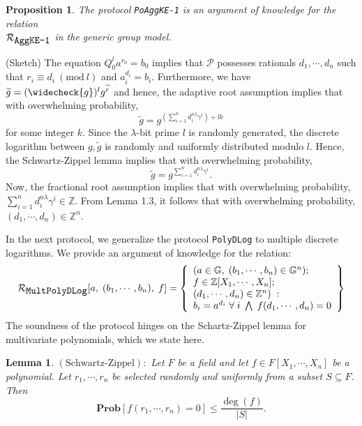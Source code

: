 \documentclass[11pt, lettersize, notitlepage, leqno, footskip=0.6cm]{article}
\newcommand{\bz}{\mathbb Z}
\newcommand{\slim}{\sum\limits}
\newcommand{\wti}{\widetilde}
\newcommand{\mc}{\mathcal}
\newcommand{\mb}{\mathbb}
\newcommand{\mbf}{\mathbf}
\newcommand{\mr}{\mathrm}
\newcommand{\lam}{\lambda}
\newcommand{\weck}{\widecheck}
\newcommand{\sub}{\subseteq}
\newcommand{\mP}{\mc{P}}
\newcommand{\vs}{\vspace{-0.15cm}}
\newcommand{\op}{overwhelming probability}
\newcommand{\Mod}[1]{\ (\mathrm{mod}\ #1)}
\newtheorem{Prop}[Thm]{Proposition}
\newtheorem{Lem}[Thm]{Lemma}
\numberwithin{equation}{section}
\begin{document}
\vspace{0.2cm}

\begin{Prop} The protocol \verb|PoAggKE-1| is an argument of knowledge for the relation\\ $\mc{R}_{{\protect\verb|AggKE-1|}}$ in the generic group model.\end{Prop}

\begin{prf} (Sketch) The equation $Q_0^la^{r_0} = b_0$ implies that $\mP$ possesses rationals $d_1,\cdots,d_n$ such that $r_i\equiv d_i\Mod{l}$ and 
$a_i^{d_i} = b_i$. Furthermore, we have $\wti{g} = (\weck{g})^lg^{\wti{r}}$ and hence, the adaptive root assumption implies that with \op, \vs $$\wti{g} = g^{(\slim_{i=1}^n d_i^{n\lam}\gamma^i)+lk} $$ for some integer $k$. Since the $\lam$-bit prime $l$ is randomly generated, the discrete logarithm between $g,\wti{g}$ is randomly and uniformly distributed modulo $l$. Hence, the Schwartz-Zippel lemma implies that with \op, \vs $$\wti{g} = g^{\slim_{i=1}^n d_i^{n\lam}\gamma^i}.$$ Now, the fractional root assumption implies that with \op, $\slim_{i=1}^n d_i^{n\lam}\gamma^i\in\bz$. From Lemma 1.3, it follows that with \op, $(d_1,\cdots,d_n)\in\bz^n$.\end{prf}

\bigskip

In the next protocol, we generalize the protocol \verb|PolyDLog| to multiple discrete logarithms. We provide an argument of knowledge for the relation: 
\[
  \mc{R}_{{\protect\verb|MultPolyDLog|}}[a,\; (b_1,\cdots, b_n),\; f] = \left\{\begin{array}{l}
    (a\in\mb{G},\; (b_1,\cdots, b_n)\in\mb{G}^n);\\
    f\in\bz[X_1,\cdots,X_n];\\ 
    (d_1,\cdots,d_n)\in\bz^n)\;: \\
    b_i = a^{d_i}\;\forall\; i\;\bigwedge \;   f(d_1,\cdots,d_n) = 0 
  \end{array}\right\}
\] The soundness of the protocol hinges on the Schartz-Zippel lemma for multivariate polynomials, which we state here.

\begin{Lem} $\mr{(Schwartz\text{-}Zippel)}:$ Let $F$ be a field and let $f\in F[X_1,\cdots,X_n]$ be a polynomial. Let $r_1,\cdots,r_n$ be selected randomly and uniformly from a subset $S\sub F$. Then \vspace{-0.1cm}$$\mbf{Prob}[f(r_1,\cdots, r_n) = 0] \leq \frac{\deg(f)}{|S|}.$$\end{Lem}
\end{document}
